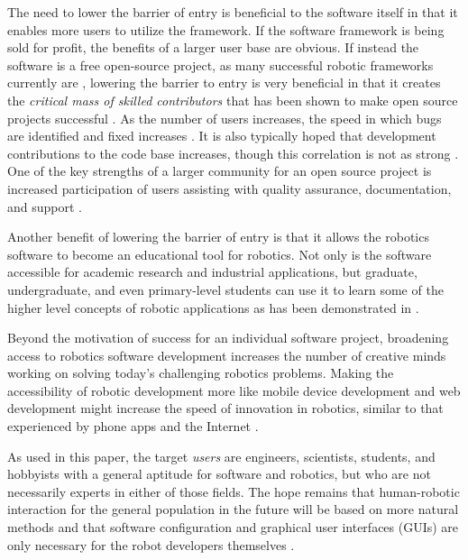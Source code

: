 \documentclass[10pt,journal,compsoc]{joser1}
\begin{document}
{The need to lower the barrier of entry is beneficial to the software itself in
that it enables more users to utilize the framework. If the software framework
is being sold for profit, the benefits of a larger user base are obvious. If
instead the software is a free open-source project, as many successful robotic
frameworks currently are \cite{makarenko2007benefits}, lowering the barrier to
entry is very beneficial in that it creates the \textit{critical mass of skilled
contributors} that has been shown to make open source projects successful
\cite{bruyninckx2001open}. As the number of users increases, the speed in which
bugs are identified and fixed increases \cite{schmidt1999software}. It is also
typically hoped that development contributions to the code base increases,
though this correlation is not as strong \cite{schmidt1999software}. One of the
key strengths of a larger community for an open source project is increased
participation of users assisting with quality assurance, documentation, and
support 
\cite{schmidt2001leveraging}.

Another benefit of lowering the barrier of entry is that it allows the robotics
software to become an educational tool for robotics. Not only is the software
accessible for academic research and industrial applications, but graduate,
undergraduate, and even primary-level students can use it to learn some of the
higher level concepts of robotic applications as has been demonstrated in
\cite{correll2013one, moll2011teaching, guyot2011teaching}. 

Beyond the motivation of success for an individual software project, broadening
access to robotics software development increases the number of creative minds
working on solving today's challenging robotics problems. Making the
accessibility of robotic development more like mobile device development and web
development might increase the speed of innovation in robotics, similar to that
experienced by phone apps and the Internet \cite{boudreau2012let}.

As used in this paper, the target \textit{users} are engineers, scientists,
students, and hobbyists with a general aptitude for software and robotics, but
who are not necessarily experts in either of those fields. The hope remains that
human-robotic interaction for the general population in the future will be based
on more natural methods and that software configuration and graphical user
interfaces (GUIs) are only necessary for the robot developers themselves
\cite{yancotaxonomy}.

}
\end{document}
